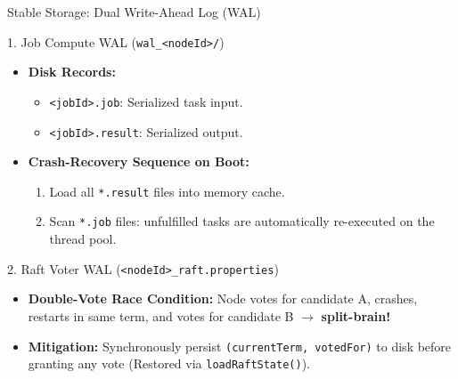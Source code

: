 \documentclass[aspectratio=169, 10pt]{beamer}
\begin{document}
\begin{frame}{Stable Storage: Dual Write-Ahead Log (WAL)}
    \begin{block}{1. Job Compute WAL (\texttt{wal\_<nodeId>/})}
        \begin{itemize}
            \item \textbf{Disk Records:}
            \begin{itemize}
                \item \texttt{<jobId>.job}: Serialized task input.
                \item \texttt{<jobId>.result}: Serialized output.
            \end{itemize}
            \item \textbf{Crash-Recovery Sequence on Boot:}
            \begin{enumerate}
                \item Load all \texttt{*.result} files into memory cache.
                \item Scan \texttt{*.job} files: unfulfilled tasks are automatically re-executed on the thread pool.
            \end{enumerate}
        \end{itemize}
    \end{block}
    
    \vspace{0.15cm}
    
    \begin{alertblock}{2. Raft Voter WAL (\texttt{<nodeId>\_raft.properties})}
        \begin{itemize}
            \item \textbf{Double-Vote Race Condition:} Node votes for candidate A, crashes, restarts in same term, and votes for candidate B $\to$ \textbf{split-brain!}
            \item \textbf{Mitigation:} Synchronously persist \texttt{(currentTerm, votedFor)} to disk before granting any vote (Restored via \texttt{loadRaftState()}).
        \end{itemize}
    \end{alertblock}
\end{frame}
\end{document}
